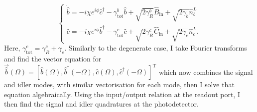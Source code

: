 \begin{equation}\begin{cases}\label{eq:nOPO_EoM}
\dot{\hat{b}}=-i\chi e^{i\phi}\hat{c}^\dagger - \gamma^b_\mathrm{tot} \hat{b} + \sqrt{2\gamma^b_R}\hat{B}_\mathrm{in} + \sqrt{2\gamma_b}\hat{n}^L_b\\
\dot{\hat{c}}=-i\chi e^{i\phi}\hat{b}^\dagger - \gamma^c_\mathrm{tot} \hat{c} + \sqrt{2\gamma^c_R}\hat{C}_\mathrm{in} + \sqrt{2\gamma_c}\hat{n}^L_c.
\end{cases}\end{equation}
Here, $\gamma^c_\text{tot}=\gamma^c_R+\gamma_c$.
Similarly to the degenerate case, I take Fourier transforms and find the vector equation for $\vec{\hat b}(\Omega)=[\hat b(\Omega), \hat b^\dag(-\Omega), \hat c(\Omega), \hat c^\dag(-\Omega)]^\text{T}$ which now combines the signal and idler modes, with similar vectorisation for each mode, then I solve that equation algebraically. Using the input/output relation at the readout port, I then find the signal and idler quadratures at the photodetector.

